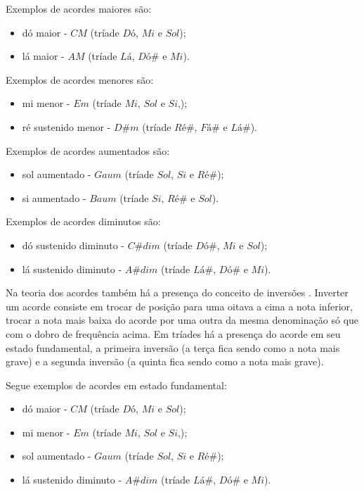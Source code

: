 Exemplos de acordes maiores são:
\begin{itemize}
	\item dó maior - $CM$ (tríade $Dó$, $Mi$ e $Sol$);
	\item lá maior - $AM$ (tríade $Lá$, $Dó\#$ e $Mi$).
\end{itemize}

Exemplos de acordes menores são:
\begin{itemize}
	\item mi menor - $Em$ (tríade  $Mi$, $Sol$ e $Si$,);
	\item ré sustenido menor - $D\#m$ (tríade $Ré\#$, $Fá\#$ e $Lá\#$).
\end{itemize}

Exemplos de acordes aumentados são:
\begin{itemize}
	\item sol aumentado - $Gaum$ (tríade  $Sol$, $Si$ e $Ré\#$);
	\item si aumentado - $Baum$ (tríade $Si$, $Ré\#$ e $Sol$).
\end{itemize}

Exemplos de acordes diminutos são:
\begin{itemize}
	\item dó sustenido diminuto - $C\#dim$ (tríade $Dó\#$, $Mi$ e $Sol$);
	\item lá sustenido diminuto - $A\#dim$ (tríade $Lá\#$, $Dó\#$ e $Mi$).
\end{itemize}

Na teoria dos acordes também há a presença do conceito de inversões \cite{med1996teoria}. Inverter um acorde consiste em trocar de posição para uma oitava a cima a nota inferior, trocar a nota mais baixa do acorde por uma outra da mesma denominação só que com o dobro de frequência acima. Em tríades há a presença do acorde em seu estado fundamental, a primeira inversão (a terça fica sendo como a nota mais grave) e a segunda inversão (a quinta fica sendo como a nota mais grave).

Segue exemplos de acordes em estado fundamental:
\begin{itemize}
	\item dó maior - $CM$ (tríade $Dó$, $Mi$ e $Sol$);
	\item mi menor - $Em$ (tríade  $Mi$, $Sol$ e $Si$,);
	\item sol aumentado - $Gaum$ (tríade  $Sol$, $Si$ e $Ré\#$);
	\item lá sustenido diminuto - $A\#dim$ (tríade $Lá\#$, $Dó\#$ e $Mi$).
\end{itemize}

